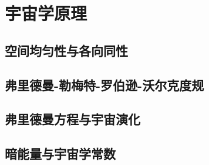 \documentclass[a4paper]{report}
\begin{document}
\chapter{宇宙学原理}
\section{空间均匀性与各向同性}
\section{弗里德曼-勒梅特-罗伯逊-沃尔克度规}
\section{弗里德曼方程与宇宙演化}
\section{暗能量与宇宙学常数}


%
\end{document}
